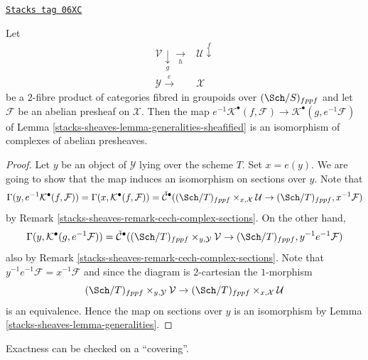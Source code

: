 \begin{lemma}
\label{stacks-sheaves-lemma-base-change-cech-complex}
\href{https://stacks.math.columbia.edu/tag/06XC}{\texttt{Stacks tag 06XC}}

Let
$$
\begin{array}{cc}\mathcal{V} \underset{g}{\downarrow}\underset{h}{\longrightarrow} & \mathcal{U} \overset{f}{\downarrow} \\ \mathcal{Y} \overset{e}{\longrightarrow} & \mathcal{X}\end{array}
$$
be a $2$-fibre product of categories fibred in groupoids over
$(\Sch/S)_{fppf}$ and let $\mathcal{F}$ be an abelian presheaf
on $\mathcal{X}$. Then the map
$e^{-1}\mathcal{K}^\bullet(f, \mathcal{F}) \to
\mathcal{K}^\bullet(g, e^{-1}\mathcal{F})$
of
Lemma \ref{stacks-sheaves-lemma-generalities-sheafified}
is an isomorphism of complexes of abelian presheaves.
\end{lemma}

\begin{proof}
Let $y$ be an object of $\mathcal{Y}$ lying over the scheme $T$.
Set $x = e(y)$. We are going to show that the map induces an isomorphism
on sections over $y$. Note that
$$
\Gamma(y, e^{-1}\mathcal{K}^\bullet(f, \mathcal{F})) =
\Gamma(x, \mathcal{K}^\bullet(f, \mathcal{F})) =
\check{\mathcal{C}}^\bullet(
(\Sch/T)_{fppf} \times_{x, \mathcal{X}} \mathcal{U} \to
(\Sch/T)_{fppf}, x^{-1}\mathcal{F})
$$
by
Remark \ref{stacks-sheaves-remark-cech-complex-sections}. On the other hand,
$$
\Gamma(y, \mathcal{K}^\bullet(g, e^{-1}\mathcal{F})) =
\check{\mathcal{C}}^\bullet(
(\Sch/T)_{fppf} \times_{y, \mathcal{Y}} \mathcal{V} \to
(\Sch/T)_{fppf}, y^{-1}e^{-1}\mathcal{F})
$$
also by
Remark \ref{stacks-sheaves-remark-cech-complex-sections}.
Note that $y^{-1}e^{-1}\mathcal{F} = x^{-1}\mathcal{F}$
and since the diagram is $2$-cartesian the $1$-morphism
$$
(\Sch/T)_{fppf} \times_{y, \mathcal{Y}} \mathcal{V} \to
(\Sch/T)_{fppf} \times_{x, \mathcal{X}} \mathcal{U}
$$
is an equivalence. Hence the map on sections over $y$ is an
isomorphism by
Lemma \ref{stacks-sheaves-lemma-generalities}.
\end{proof}

Exactness can be checked on a ``covering''.

